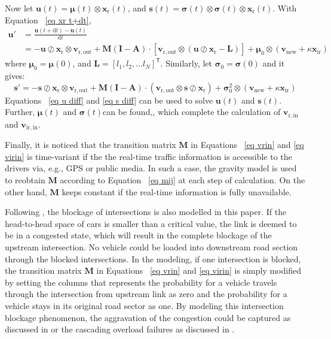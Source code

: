 \documentclass[review,11pt,nonatbib]{elsarticle}
\begin{document}
\par Now let $\mathbf{u}(t)={\bm{\mu}}(t)\otimes \mathbf{x}_{\mathrm{r}}(t)$, and $\mathbf{s}(t)={\bm{\sigma}}(t)\otimes {\bm{\sigma}}(t)\otimes \mathbf{x}_{\mathrm{r}}(t)$. With Equation ~\eqref{eq xr t+dt},
\begin{equation}\label{eq u diff}
\begin{aligned}
\mathbf{u}' &= \frac{\mathbf{u}(t+\mathrm{d}t)-\mathbf{u}(t)}{\mathrm{d}t} \\
&=  - \mathbf{u}\oslash \mathbf{x}_{\mathrm{r}} \otimes\mathbf{v}_{\mathrm{r,out}}+ \mathbf{M}(\mathbf{I}-\mathbf{A})\cdot \left[\mathbf{v}_{\mathrm{r,out}}\otimes(\mathbf{u}\oslash \mathbf{x}_{\mathrm{r}}-\mathbf{L})\right] + {\bm{\mu}_0}\otimes(\mathbf{v}_{\mathrm{new}} +\kappa \mathbf{x}_{\mathrm{ir}})
\end{aligned}
\end{equation}
where  ${\bm{\mu}_0}= {\bm{\mu}}(0)$, and $\mathbf{L}=[l_1,l_2,\ldots l_N]^{\textsf{T}}$. Similarly, let ${\bm{\sigma}_0}= {\bm{\sigma}}(0)$ and it gives:
\begin{equation}\label{eq s diff}
\mathbf{s}' = - \mathbf{s}\oslash \mathbf{x}_{\mathrm{r}} \otimes\mathbf{v}_{\mathrm{r,out}}+ \mathbf{M}(\mathbf{I}-\mathbf{A})\cdot \left(\mathbf{v}_{\mathrm{r,out}}\otimes\mathbf{s}\oslash \mathbf{x}_{\mathrm{r}}\right) + {\bm{\sigma}_0^2}\otimes(\mathbf{v}_{\mathrm{new}} +\kappa \mathbf{x}_{\mathrm{ir}})
\end{equation}
Equations ~\eqref{eq u diff} and \eqref{eq s diff} can be used to solve $\mathbf{u}(t)$ and $\mathbf{s}(t)$. Further, $\bm{\mu}(t)$ and $\bm{\sigma}(t)$can be found,, which complete the calculation of $\mathbf{v}_{\mathrm{r,in}}$ and $\mathbf{v}_{\mathrm{ir,in}}$.
\par Finally, it is noticed that the transition matrix $\mathbf{M}$ in Equations ~\eqref{eq vrin} and \eqref{eq virin} is time-variant if the the real-time traffic information is accessible to the drivers via, e.g., GPS or public media. In such a case, the gravity model is used to reobtain $\mathbf{M}$ according to Equation ~\eqref{eq mij} at each step of calculation. On the other hand, $\mathbf{M}$ keeps constant if the real-time information is fully unavailable.

\par Following \citep{feng2017post}, the blockage of intersections is also modelled in this paper. If the head-to-head space of cars is smaller than a critical value, the link is deemed to be in a congested state, which will result in the complete blockage of the upstream intersection. No vehicle could be loaded into downstream road section through the blocked intersections. In the modeling, if one intersection is blocked,  the transition matrix $\mathbf{M}$  in Equations ~\eqref{eq vrin} and \eqref{eq virin} is simply modified by setting the columns that represents the probability for a vehicle travels through the intersection from upstream link as zero and the probability for a vehicle stays in its original road sector as one. By modeling this intersection blockage phenomenon, the aggravation of the congestion could be captured as discussed in \citep{feng2017post} or the cascading overload failures as discussed in \citep{zhao2016spatio}.
\end{document}
